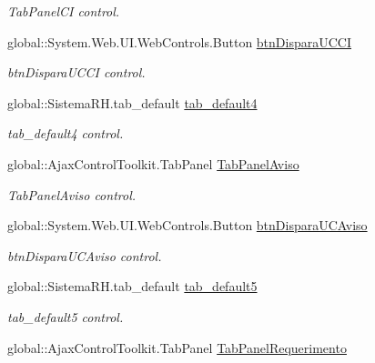\begin{DoxyCompactItemize}
\begin{DoxyCompactList}\small\item\em TabPanelCI control. \item\end{DoxyCompactList}\item 
global::System.Web.UI.WebControls.Button \hyperlink{class_sistema_r_h_1_1_alterar_colaborador_a34c9bfddf4a54fafefb366b475c586b5}{btnDisparaUCCI}
\begin{DoxyCompactList}\small\item\em btnDisparaUCCI control. \item\end{DoxyCompactList}\item 
global::SistemaRH.tab\_\-default \hyperlink{class_sistema_r_h_1_1_alterar_colaborador_a45f9455871319d24c84f7d6071de6d71}{tab\_\-default4}
\begin{DoxyCompactList}\small\item\em tab\_\-default4 control. \item\end{DoxyCompactList}\item 
global::AjaxControlToolkit.TabPanel \hyperlink{class_sistema_r_h_1_1_alterar_colaborador_a10569e565185ae6cdf1f2fec1e01543c}{TabPanelAviso}
\begin{DoxyCompactList}\small\item\em TabPanelAviso control. \item\end{DoxyCompactList}\item 
global::System.Web.UI.WebControls.Button \hyperlink{class_sistema_r_h_1_1_alterar_colaborador_a5bbdb9da5cd6e85eead5d5de37d6170b}{btnDisparaUCAviso}
\begin{DoxyCompactList}\small\item\em btnDisparaUCAviso control. \item\end{DoxyCompactList}\item 
global::SistemaRH.tab\_\-default \hyperlink{class_sistema_r_h_1_1_alterar_colaborador_a8274d1fac110f8b0c560f74f0d3b9dba}{tab\_\-default5}
\begin{DoxyCompactList}\small\item\em tab\_\-default5 control. \item\end{DoxyCompactList}\item 
global::AjaxControlToolkit.TabPanel \hyperlink{class_sistema_r_h_1_1_alterar_colaborador_a0ca2c8e74bd9b6f067256d1bb5a97b7b}{TabPanelRequerimento}

\end{DoxyCompactItemize}
